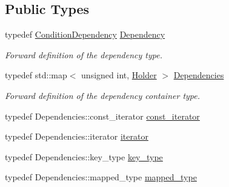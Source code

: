\subsection*{Public Types}
\begin{DoxyCompactItemize}
\item 
typedef \hyperlink{class_d_d4hep_1_1_conditions_1_1_condition_dependency}{ConditionDependency} \hyperlink{class_d_d4hep_1_1_conditions_1_1_conditions_dependency_collection_a87252585d3e17ae82813c039b1b47e8a}{Dependency}
\begin{DoxyCompactList}\small\item\em Forward definition of the dependency type. \item\end{DoxyCompactList}\item 
typedef std::map$<$ unsigned int, \hyperlink{struct_d_d4hep_1_1_conditions_1_1_conditions_dependency_collection_1_1_holder}{Holder} $>$ \hyperlink{class_d_d4hep_1_1_conditions_1_1_conditions_dependency_collection_a7fb4072b6036f59389b929e312e2679c}{Dependencies}
\begin{DoxyCompactList}\small\item\em Forward definition of the dependency container type. \item\end{DoxyCompactList}\item 
typedef Dependencies::const\_\-iterator \hyperlink{class_d_d4hep_1_1_conditions_1_1_conditions_dependency_collection_ab5e9bcdc3330c3b694303f627799dc84}{const\_\-iterator}
\item 
typedef Dependencies::iterator \hyperlink{class_d_d4hep_1_1_conditions_1_1_conditions_dependency_collection_a685a1a6841f2fa4d70ab9a9bfb7b0b6a}{iterator}
\item 
typedef Dependencies::key\_\-type \hyperlink{class_d_d4hep_1_1_conditions_1_1_conditions_dependency_collection_a97fa0f42a622cd23c6eeb92e2b63efab}{key\_\-type}
\item 
typedef Dependencies::mapped\_\-type \hyperlink{class_d_d4hep_1_1_conditions_1_1_conditions_dependency_collection_a406b7e79f4192c1d4ab1cdeb500d81f4}{mapped\_\-type}
\end{DoxyCompactItemize}
